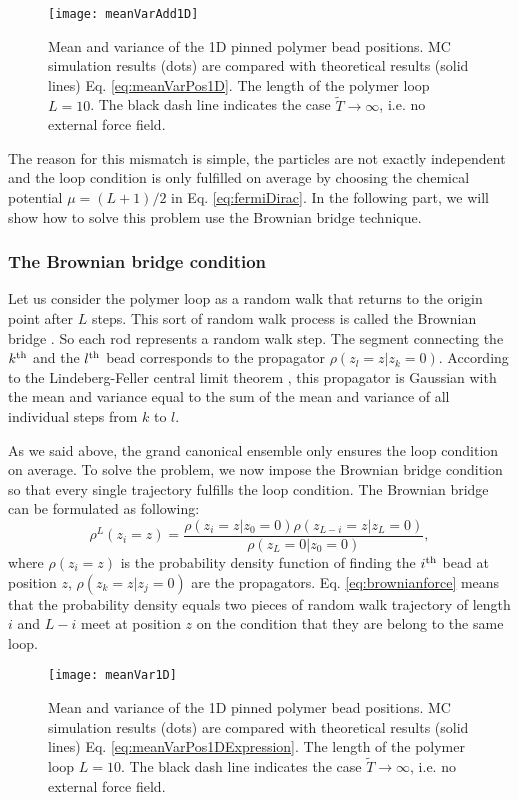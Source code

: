 \begin{figure}[htpb]
    \centering
    \texttt{[image: meanVarAdd1D]}
    \caption{Mean and variance of the 1D pinned polymer bead positions. MC simulation results (dots) are compared with theoretical results (solid lines) Eq. \ref{eq:meanVarPos1D}. The length of the polymer loop $L=10$. The black dash line indicates the case $\tilde{T}\rightarrow\infty$, i.e. no external force field. }
    \label{fig:meanVarAdd1D}
\end{figure}

The reason for this mismatch is simple, the particles are not exactly independent and the loop condition is only fulfilled on average by choosing the chemical potential $\mu=(L+1)/2$ in Eq. \eqref{eq:fermiDirac}. In the following part, we will show how to solve this problem use the Brownian bridge technique. 

\subsubsection{The Brownian bridge condition}
\label{ssub:The Brownian Bridge Condition}
Let us consider the polymer loop as a random walk that returns to the origin point after $L$ steps. This sort of random walk process is called the Brownian bridge \cite{Feller2008,Athreya2006}. So each rod represents a random walk step. The segment connecting the $k^{\rm{th}}$ and the $l^{\rm{th}}$ bead corresponds to the propagator $\rho(z_l = z | z_k=0)$. According to the Lindeberg-Feller central limit theorem \cite{Feller2008}, this propagator is Gaussian with the mean and variance equal to the sum of the mean and variance of all individual steps from $k$ to $l$.

As we said above, the grand canonical ensemble only ensures the loop condition on average. To solve the problem, we now impose the Brownian bridge condition so that every single trajectory fulfills the loop condition. The Brownian bridge can be formulated as following:
\begin{equation}
    \label{eq:brownianBridge}
    \rho^L(z_i=z) = \frac{\rho(z_i=z|z_0=0)\rho(z_{L-i}=z|z_L=0)}{\rho(z_L=0|z_0=0)},
\end{equation}
where $\rho(z_i=z)$ is the probability density function of finding the $i^{\rm{th}}$ bead at position $z$, $\rho(z_k=z|z_j=0)$ are the propagators. Eq. \eqref{eq:brownianforce} means that the probability density equals two pieces of random walk trajectory of length $i$ and $L-i$ meet at position $z$ on the condition that they are belong to the same loop. 
\begin{figure}[htpb]
    \centering
    \texttt{[image: meanVar1D]}
    \caption{Mean and variance of the 1D pinned polymer bead positions. MC simulation results (dots) are compared with theoretical results (solid lines) Eq. \ref{eq:meanVarPos1DExpression}. The length of the polymer loop $L=10$. The black dash line indicates the case $\tilde{T}\rightarrow\infty$, i.e. no external force field. }
    \label{fig:meanVar1D}
\end{figure}

